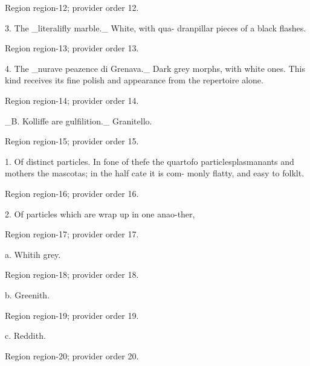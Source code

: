 \documentclass[11pt]{article}
\begin{document}
{\scriptsize\color{gray} Region region-12; provider order 12.\par}
\medskip

3. The \_literalifly marble.\_ White, with qua- dranpillar pieces of a black flashes.
\par

{\scriptsize\color{gray} Region region-13; provider order 13.\par}
\medskip

4. The \_nurave peazence di Grenava.\_ Dark grey morphs, with white ones. This kind receives its fine polish and appearance from the repertoire alone.
\par

{\scriptsize\color{gray} Region region-14; provider order 14.\par}
\medskip

\_B. Kolliffe are gulfilition.\_ Granitello.
\par

{\scriptsize\color{gray} Region region-15; provider order 15.\par}
\medskip

1. Of distinct particles. In fone of thefe the quartofo particlesplasmanants and mothers the mascotas; in the half cate it is com- monly flatty, and easy to folklt.
\par

{\scriptsize\color{gray} Region region-16; provider order 16.\par}
\medskip

2. Of particles which are wrap up in one anao-ther,
\par

{\scriptsize\color{gray} Region region-17; provider order 17.\par}
\medskip

a. Whitih grey.
\par

{\scriptsize\color{gray} Region region-18; provider order 18.\par}
\medskip

b. Greenith.
\par

{\scriptsize\color{gray} Region region-19; provider order 19.\par}
\medskip

c. Reddith.
\par

{\scriptsize\color{gray} Region region-20; provider order 20.\par}
\medskip
\end{document}
